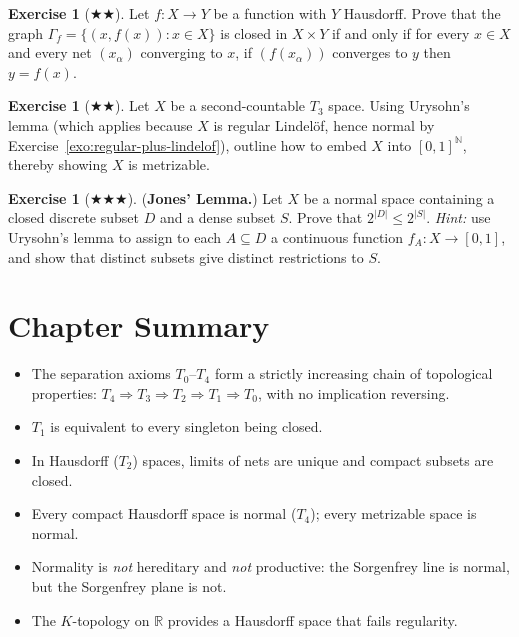 \documentclass[11pt,a4paper,twoside]{book}
\theoremstyle{remark}
\theoremstyle{definition}
\newtheorem{exerciseplain}[theorem]{Exercise}
\theoremstyle{definition}
\newenvironment{exercise}[1][]{%
  \begin{exerciseplain}[#1]
}{%
  \end{exerciseplain}
}
\begin{document}
\begin{exercise}[$\bigstar\bigstar$]\label{exo:closed-graph}
Let $f \colon X \to Y$ be a function with $Y$ Hausdorff.  Prove that the graph
$\Gamma_f = \{(x, f(x)) : x \in X\}$ is closed in $X \times Y$ if and only if
for every $x \in X$ and every net $(x_\alpha)$ converging to $x$, if
$(f(x_\alpha))$ converges to $y$ then $y = f(x)$.
\end{exercise}

\begin{exercise}[$\bigstar\bigstar$]\label{exo:urysohn-metrization}
Let $X$ be a second-countable $T_3$ space.  Using Urysohn's lemma (which
applies because $X$ is regular Lindel\"of, hence normal by
Exercise~\ref{exo:regular-plus-lindelof}), outline how to embed $X$ into
$[0,1]^{\mathbb{N}}$, thereby showing $X$ is metrizable.
\end{exercise}

\begin{exercise}[$\bigstar\bigstar\bigstar$]\label{exo:jones-lemma}
(\textbf{Jones' Lemma.})
Let $X$ be a normal space containing a closed discrete subset $D$ and a dense
subset $S$.  Prove that $2^{|D|} \le 2^{|S|}$.
\emph{Hint:} use Urysohn's lemma to assign to each $A \subseteq D$ a
continuous function $f_A \colon X \to [0,1]$, and show that distinct subsets
give distinct restrictions to $S$.
\end{exercise}

\section{Chapter Summary}
\label{sec:separation-summary}

\begin{itemize}
\item The separation axioms $T_0$--$T_4$ form a strictly increasing chain of
  topological properties: $T_4 \Rightarrow T_3 \Rightarrow T_2 \Rightarrow
  T_1 \Rightarrow T_0$, with no implication reversing.
\item $T_1$ is equivalent to every singleton being closed.
\item In Hausdorff ($T_2$) spaces, limits of nets are unique and compact
  subsets are closed.
\item Every compact Hausdorff space is normal ($T_4$); every metrizable space
  is normal.
\item Normality is \emph{not} hereditary and \emph{not} productive: the
  Sorgenfrey line is normal, but the Sorgenfrey plane is not.
\item The $K$-topology on $\mathbb{R}$ provides a Hausdorff space that fails
  regularity.
\end{itemize}
\end{document}
